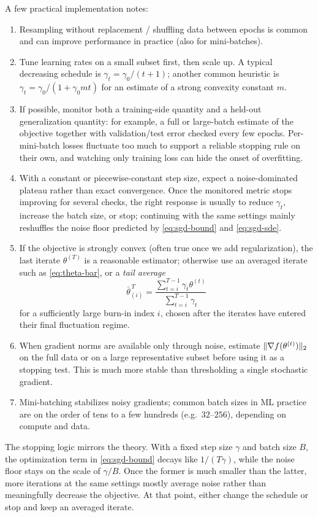 A few practical implementation notes:
\begin{enumerate}[leftmargin=*,label=(\arabic*)]
  \item Resampling without replacement / shuffling data between epochs is common and can improve performance in practice (also for mini-batches).
  \item Tune learning rates on a small subset first, then scale up.
  A typical decreasing schedule is $\gamma_t = \gamma_0/(t+1)$; another common heuristic is $\gamma_t = \gamma_0/(1+\gamma_0 m t)$ for an estimate of a strong convexity constant $m$.
  \item If possible, monitor both a training-side quantity and a held-out generalization quantity: for example, a full or large-batch estimate of the objective together with validation/test error checked every few epochs.
  Per-mini-batch losses fluctuate too much to support a reliable stopping rule on their own, and watching only training loss can hide the onset of overfitting.
  \item With a constant or piecewise-constant step size, expect a noise-dominated plateau rather than exact convergence.
  Once the monitored metric stops improving for several checks, the right response is usually to reduce $\gamma_t$, increase the batch size, or stop; continuing with the same settings mainly reshuffles the noise floor predicted by \eqref{eq:sgd-bound} and \eqref{eq:sgd-sde}.
  \item If the objective is strongly convex (often true once we add regularization), the last iterate $\theta^{(T)}$ is a reasonable estimator; otherwise use an averaged iterate such as \eqref{eq:theta-bar}, or a \emph{tail average}
  \[
  \bar\theta^{\,T}_{(i)} = \frac{\sum_{t=i}^{T-1} \gamma_t \theta^{(t)}}{\sum_{t=i}^{T-1}\gamma_t}
  \]
  for a sufficiently large burn-in index $i$, chosen after the iterates have entered their final fluctuation regime.
  \item When gradient norms are available only through noise, estimate $\lVert\nabla f(\theta^{(t)})\rVert_2$ on the full data or on a large representative subset before using it as a stopping test.
  This is much more stable than thresholding a single stochastic gradient.
  \item Mini-batching stabilizes noisy gradients; common batch sizes in ML practice are on the order of tens to a few hundreds (e.g.\ $32$--$256$), depending on compute and data.
\end{enumerate}

The stopping logic mirrors the theory.
With a fixed step size $\gamma$ and batch size $B$, the optimization term in \eqref{eq:sgd-bound} decays like $1/(T\gamma)$, while the noise floor stays on the scale of $\gamma/B$.
Once the former is much smaller than the latter, more iterations at the same settings mostly average noise rather than meaningfully decrease the objective.
At that point, either change the schedule or stop and keep an averaged iterate.

